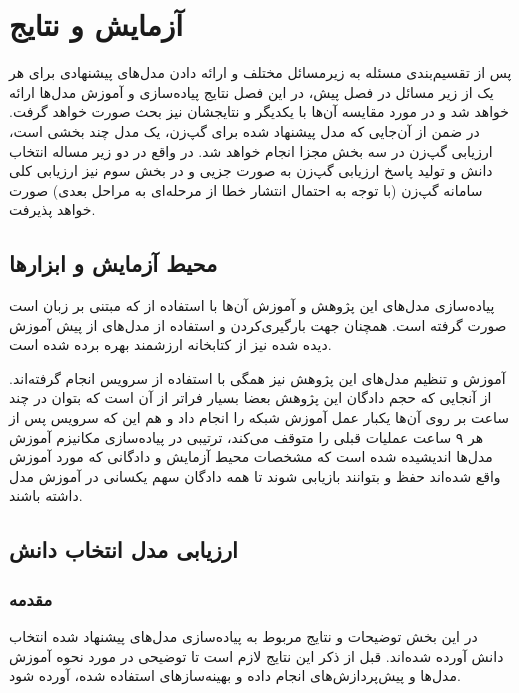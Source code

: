 \chapter{آزمایش و نتایج}\label{Chap5}
\minitoc

پس از تقسیم‌بندی مسئله به زیرمسائل مختلف و ارائه دادن مدل‌های پیشنهادی برای هر یک از زیر مسائل در فصل پیش، در این فصل نتایج پیاده‌سازی و آموزش مدل‌ها ارائه خواهد شد و در مورد مقایسه آن‌ها با یکدیگر و نتایجشان نیز بحث صورت خواهد گرفت. در ضمن از آن‌جایی که مدل پیشنهاد شده برای گپ‌زن، یک مدل چند بخشی است، ارزیابی گپ‌زن در سه بخش مجزا انجام خواهد شد. در واقع در دو زیر مساله انتخاب دانش و تولید پاسخ ارزیابی گپ‌زن به صورت جزیی و در بخش سوم نیز ارزیابی کلی سامانه گپ‌زن (با توجه به احتمال انتشار خطا از مرحله‌ای به مراحل بعدی) صورت خواهد پذیرفت.

\section{محیط آزمایش و ابزارها}

پیاده‌سازی مدل‌های این پژوهش و آموزش‌‌ ‌آن‌ها با استفاده از 
که مبتنی بر زبان
است صورت گرفته است. همچنان جهت بارگیری‌کردن و استفاده از مدل‌های از پیش آموزش دیده شده نیز از کتابخانه ارزشمند 
بهره برده شده است. 

آموزش و تنظیم‌ مدل‌های این پژوهش نیز همگی با استفاده از سرویس 
انجام گرفته‌اند. از آنجایی که حجم دادگان این پژوهش بعضا بسیار فراتر از آن است که بتوان در چند ساعت بر روی آن‌ها یکبار عمل آموزش شبکه را انجام داد و هم این که سرویس 
پس از هر ۹ ساعت عملیات قبلی را متوقف می‌کند،‌ ترتیبی در پیاده‌سازی مکانیزم آموزش مدل‌ها اندیشیده شده است که مشخصات محیط آزمایش و دادگانی که مورد آموزش واقع ‌شده‌اند حفظ و بتوانند بازیابی شوند تا همه دادگان سهم یکسانی در آموزش مدل داشته باشند. 



\section{ارزیابی مدل انتخاب دانش}
\subsection{مقدمه}
در این بخش توضیحات و نتایج مربوط به پیاده‌سازی مدل‌های پیشنهاد شده انتخاب دانش آورده شده‌اند. قبل از ذکر این نتایج لازم است تا توضیحی در مورد نحوه آموزش مدل‌ها و پیش‌پردازش‌های انجام داده و بهینه‌سازهای استفاده شده، آورده شود.

